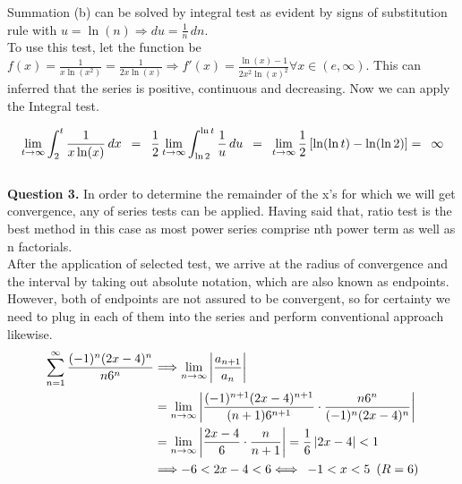 \documentclass[a4paper]{exam}
\begin{document}
	\noindent Summation (b) can be solved by integral test as evident by signs of substitution rule with $u = \ln(n) \Longrightarrow du = \frac{1}{n} \, dn$. \\[1ex]
	
	\noindent To use this test, let the function be $f(x) = \frac{1}{x \ln(x^2)} = \frac{1}{2x \ln(x)} \Longrightarrow f'(x) = \frac{\ln(x) - 1}{2x^2 \ln(x)^2} \forall x \in (e, \infty)$. This can inferred that the series is positive, continuous and decreasing. Now we can apply the Integral test.
	
	\begin{equation*}
		\lim_{t \to \infty} \int_{2}^{t} \frac{1}{x \ln(x)} \, dx 
		\hspace{0.5em} = \hspace{0.5em} \frac{1}{2} \lim_{t \to \infty} \int_{\ln 2}^{\ln t} \frac{1}{u} \, du 
		\hspace{0.5em} = \hspace{0.5em} \lim_{t \to \infty} \frac{1}{2} \left[ \ln(\ln t) - \ln(\ln 2) \right] = \hspace{0.5em} \infty
	\end{equation*}\\[0.5ex]
	\noindent \textbf{Question 3.} In order to determine the remainder of the x's for which we will get convergence, any of series tests can be applied. Having said that, ratio test is the best method in this case as most power series comprise nth power term as well as n factorials. \\
	
	\noindent After the application of selected test, we arrive at the radius of convergence and the interval by taking out absolute notation, which are also known as endpoints. However, both of endpoints are not assured to be convergent, so for certainty we need to plug in each of them into the series and perform conventional approach likewise.
	\begin{align*}
		\sum_{n = 1}^{\infty} \frac{(-1)^{n}(2x - 4)^{n}}{n6^{n}} 
		&\Longrightarrow 
		\lim_{n \to \infty} \left| \frac{a_{n + 1}}{a_{n}} \right| \\
		&= \lim_{n \to \infty} \left| \frac{(-1)^{n + 1} (2x - 4)^{n + 1}}{(n + 1) 6^{n + 1}} 
		\cdot \frac{n 6^{n}}{(-1)^{n}(2x - 4)^{n}} \right| \\
		&= \lim_{n \to \infty} \left| \frac{2x - 4}{6} \cdot \frac{n}{n + 1} \right| 
		= \frac{1}{6} \left| 2x - 4 \right| < 1 \\
		&\Longrightarrow -6 < 2x - 4 < 6 \Longleftrightarrow \hspace{0.5em} -1 < x < 5 \hspace{0.5em} (R = 6)
	\end{align*}
	
\end{document}
